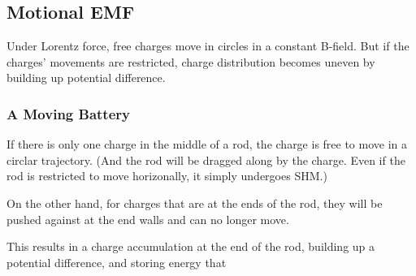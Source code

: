 \documentclass[class=article, crop=false, 12pt]{standalone}
\begin{document}
\subsection{Motional EMF}

Under Lorentz force, 
free charges move in circles in a constant B-field.
But if the charges' movements are restricted, 
charge distribution becomes uneven by building up potential difference. 

\subsubsection{A Moving Battery}

If there is only one charge in the middle of a rod, 
the charge is free to move in a circlar trajectory.
(And the rod will be dragged along by the charge. 
Even if the rod is restricted to move horizonally,
it simply undergoes SHM.)


On the other hand, for charges that are at the ends of the rod,
they will be pushed against at the end walls and can no longer move.


This results in a charge accumulation at the end of the rod, 
building up a potential difference, 
and storing energy that 

\begin{center}
\end{center}
\end{document}
